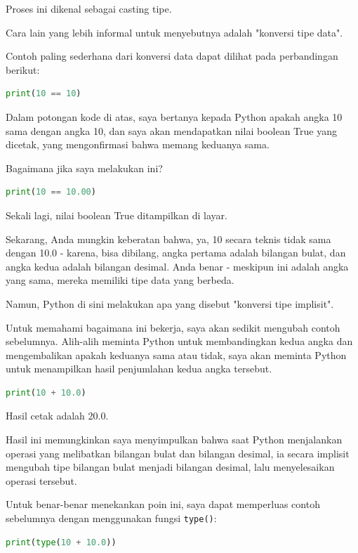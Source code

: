 \documentclass{article}
\begin{document}
Proses ini dikenal sebagai casting tipe.

Cara lain yang lebih informal untuk menyebutnya adalah "konversi tipe data".

Contoh paling sederhana dari konversi data dapat dilihat pada perbandingan berikut:
\begin{lstlisting}[language=Python, caption={}, captionpos=b]
print(10 == 10)
\end{lstlisting}

Dalam potongan kode di atas, saya bertanya kepada Python apakah angka 10 sama dengan angka 10, dan saya akan mendapatkan nilai boolean True yang dicetak, yang mengonfirmasi bahwa memang keduanya sama.

Bagaimana jika saya melakukan ini?
\begin{lstlisting}[language=Python, caption={}, captionpos=b]
print(10 == 10.00)
\end{lstlisting}

Sekali lagi, nilai boolean True ditampilkan di layar.

Sekarang, Anda mungkin keberatan bahwa, ya, 10 secara teknis tidak sama dengan 10.0 - karena, bisa dibilang, angka pertama adalah bilangan bulat, dan angka kedua adalah bilangan desimal. Anda benar - meskipun ini adalah angka yang sama, mereka memiliki tipe data yang berbeda.

Namun, Python di sini melakukan apa yang disebut "konversi tipe implisit".

Untuk memahami bagaimana ini bekerja, saya akan sedikit mengubah contoh sebelumnya. Alih-alih meminta Python untuk membandingkan kedua angka dan mengembalikan apakah keduanya sama atau tidak, saya akan meminta Python untuk menampilkan hasil penjumlahan kedua angka tersebut.

\begin{lstlisting}[language=Python, caption={}, captionpos=b]
print(10 + 10.0)
\end{lstlisting}

Hasil cetak adalah 20.0.

Hasil ini memungkinkan saya menyimpulkan bahwa saat Python menjalankan operasi yang melibatkan bilangan bulat dan bilangan desimal, ia secara implisit mengubah tipe bilangan bulat menjadi bilangan desimal, lalu menyelesaikan operasi tersebut.

Untuk benar-benar menekankan poin ini, saya dapat memperluas contoh sebelumnya dengan menggunakan fungsi \verb|type()|:
\begin{lstlisting}[language=Python, caption={}, captionpos=b]
print(type(10 + 10.0))
\end{lstlisting}
\end{document}
